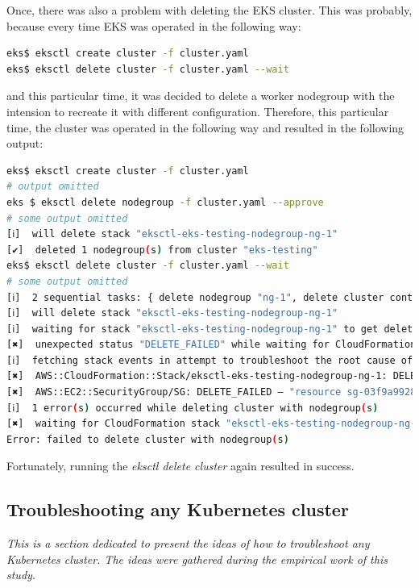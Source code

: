 Once, there was also a problem with deleting the EKS cluster. This was probably, because every time EKS was operated in the following way:
\begin{lstlisting}[basicstyle=\tiny,caption={Deleting eksctl cluster},captionpos=b,language=Bash,xleftmargin=1cm]
eks$ eksctl create cluster -f cluster.yaml
eks$ eksctl delete cluster -f cluster.yaml --wait
\end{lstlisting}
and this particular time, it was decided to delete a worker nodegroup with the intension to recreate it with different configuration. Therefore, this particular time, the cluster was operated in the following way and resulted in the following output:
\begin{lstlisting}[basicstyle=\tiny,caption={Eksctl special operations},captionpos=b,language=Bash,xleftmargin=1cm]
eks$ eksctl create cluster -f cluster.yaml
# output omitted
eks $ eksctl delete nodegroup -f cluster.yaml --approve
# some output omitted
[ℹ]  will delete stack "eksctl-eks-testing-nodegroup-ng-1"
[✔]  deleted 1 nodegroup(s) from cluster "eks-testing"
eks$ eksctl delete cluster -f cluster.yaml --wait
# some output omitted
[ℹ]  2 sequential tasks: { delete nodegroup "ng-1", delete cluster control plane "eks-testing" }
[ℹ]  will delete stack "eksctl-eks-testing-nodegroup-ng-1"
[ℹ]  waiting for stack "eksctl-eks-testing-nodegroup-ng-1" to get deleted
[✖]  unexpected status "DELETE_FAILED" while waiting for CloudFormation stack "eksctl-eks-testing-nodegroup-ng-1"
[ℹ]  fetching stack events in attempt to troubleshoot the root cause of the failure
[✖]  AWS::CloudFormation::Stack/eksctl-eks-testing-nodegroup-ng-1: DELETE_FAILED – "The following resource(s) failed to delete: [SG]. "
[✖]  AWS::EC2::SecurityGroup/SG: DELETE_FAILED – "resource sg-03f9a9928f765ecae has a dependent object (Service: AmazonEC2; Status Code: 400; Error Code: DependencyViolation; Request ID: 682fd971-5ec7-472e-9eee-4d52a44f9455)"
[ℹ]  1 error(s) occurred while deleting cluster with nodegroup(s)
[✖]  waiting for CloudFormation stack "eksctl-eks-testing-nodegroup-ng-1": ResourceNotReady: failed waiting for successful resource state
Error: failed to delete cluster with nodegroup(s)
\end{lstlisting}
Fortunately, running the \textit{eksctl delete cluster} again resulted in success.

\subsection{Troubleshooting any Kubernetes cluster}
\textit{This is a section dedicated to present the ideas of how to troubleshoot any Kubernetes cluster. The ideas were gathered during the empirical work of this study.}
\\


